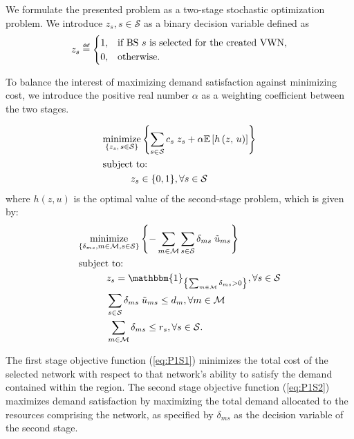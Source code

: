 \documentclass[12pt,dvipsnames]{report}
\newcommand\defeq{\mathrel{\overset{\makebox[0pt]{\mbox{\normalfont\tiny\sffamily def}}}{=}}}
\begin{document}
We formulate the presented problem as a two-stage stochastic optimization problem.  We introduce $z_s, s \in \mathcal{S}$ as a binary decision variable defined as
\[ z_s \defeq
	\begin{cases}
		1,& \text{if BS $s$ is selected for the created VWN,}\\
		0,& \text{otherwise.}
	\end{cases}
\]

To balance the interest of maximizing demand satisfaction against minimizing cost, we introduce the positive real number $\alpha$ as a weighting coefficient between the two stages.

\vspace{3mm}
\begin{tcolorbox}[title = Problem 1 (Two-Stage Stochastic Optimization Problem)]
\begin{align}
& \underset{\left\{z_s,\, s \in \mathcal{S}\right\}}{\text{minimize}} \left\{ \sum_{s \in \mathcal{S}} c_s \; z_s + \alpha \mathbb{E}\left[ h\left( z,\, u \right) \right] \right\} \label{eq:P1S1}\\
& \text{subject to:}  \nonumber \\
& \hspace{0.4in} z_s \in \{0, 1\}, \forall s \in \mathcal{S} \label{eq:P1S1C1}
\end{align}
where $h(z, u)$ is the optimal value of the second-stage problem, which is given by:
\begin{align}
& \underset{\left\{\substack{\delta_{ms}, m \in \mathcal{M}, s \in \mathcal{S}}\right\}}{\mathrm{minimize}} \left\{ - \sum_{m \in \mathcal{M}} \sum_{s \in \mathcal{S}} \delta_{ms} \; \tilde{u}_{ms} \right\} \label{eq:P1S2}\\
& \text{subject to:}  \nonumber \\
& \hspace{0.4in} z_s = \mathbbm{1}_{\left\{\sum_{m \in \mathcal{M}} \delta_{ms} > 0\right\}}, \forall s \in \mathcal{S} \label{eq:P1S2C1}\\
& \hspace{0.4in} \sum_{s \in \mathcal{S}} \delta_{ms} \; \tilde{u}_{ms} \leq d_m, \forall m \in \mathcal{M} \label{eq:P1S2C2}\\
& \hspace{0.4in} \sum_{m \in \mathcal{M}} \delta_{ms} \leq r_s, \forall s \in \mathcal{S}. \label{eq:P1S2C3}
\end{align}
\end{tcolorbox}

The first stage objective function (\ref{eq:P1S1}) minimizes the total cost of the selected network with respect to that network's ability to satisfy the demand contained within the region.  The second stage objective function (\ref{eq:P1S2}) maximizes demand satisfaction by maximizing the total demand allocated to the resources comprising the network, as specified by $\delta_{ms}$ as the decision variable of the second stage.
\end{document}
